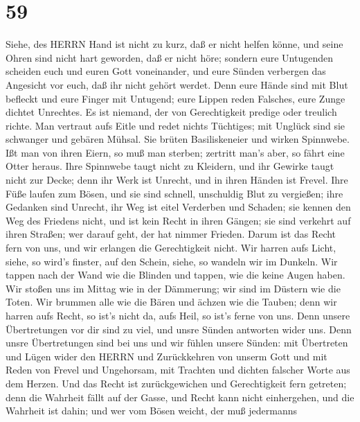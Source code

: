 \hypertarget{section-58}{%
\section{59}\label{section-58}}

 Siehe, des HERRN Hand ist nicht zu kurz, daß er nicht
helfen könne, und seine Ohren sind nicht hart geworden, daß er nicht
höre;  sondern eure Untugenden scheiden euch und euren Gott
voneinander, und eure Sünden verbergen das Angesicht vor euch, daß ihr
nicht gehört werdet.  Denn eure Hände sind mit Blut befleckt
und eure Finger mit Untugend; eure Lippen reden Falsches, eure Zunge
dichtet Unrechtes.  Es ist niemand, der von Gerechtigkeit
predige oder treulich richte. Man vertraut aufs Eitle und redet nichts
Tüchtiges; mit Unglück sind sie schwanger und gebären Mühsal.
 Sie brüten Basiliskeneier und wirken Spinnwebe. Ißt man von
ihren Eiern, so muß man sterben; zertritt man's aber, so fährt eine
Otter heraus.  Ihre Spinnwebe taugt nicht zu Kleidern, und
ihr Gewirke taugt nicht zur Decke; denn ihr Werk ist Unrecht, und in
ihren Händen ist Frevel.  Ihre Füße laufen zum Bösen, und
sie sind schnell, unschuldig Blut zu vergießen; ihre Gedanken sind
Unrecht, ihr Weg ist eitel Verderben und Schaden;  sie
kennen den Weg des Friedens nicht, und ist kein Recht in ihren Gängen;
sie sind verkehrt auf ihren Straßen; wer darauf geht, der hat nimmer
Frieden.  Darum ist das Recht fern von uns, und wir erlangen
die Gerechtigkeit nicht. Wir harren aufs Licht, siehe, so wird's
finster, auf den Schein, siehe, so wandeln wir im Dunkeln. 
Wir tappen nach der Wand wie die Blinden und tappen, wie die keine Augen
haben. Wir stoßen uns im Mittag wie in der Dämmerung; wir sind im
Düstern wie die Toten.  Wir brummen alle wie die Bären und
ächzen wie die Tauben; denn wir harren aufs Recht, so ist's nicht da,
aufs Heil, so ist's ferne von uns.  Denn unsere
Übertretungen vor dir sind zu viel, und unsre Sünden antworten wider
uns. Denn unsre Übertretungen sind bei uns und wir fühlen unsere Sünden:
 mit Übertreten und Lügen wider den HERRN und Zurückkehren
von unserm Gott und mit Reden von Frevel und Ungehorsam, mit Trachten
und dichten falscher Worte aus dem Herzen.  Und das Recht
ist zurückgewichen und Gerechtigkeit fern getreten; denn die Wahrheit
fällt auf der Gasse, und Recht kann nicht einhergehen,  und
die Wahrheit ist dahin; und wer vom Bösen weicht, der muß jedermanns
